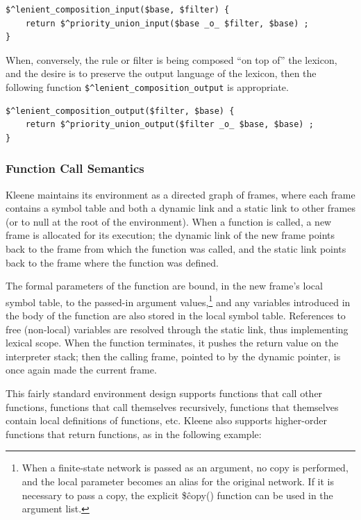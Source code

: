 \documentclass[letterpaper,12pt]{article}
\newcommand{\Kleene}{Kleene\xspace}
\begin{document}
\begin{Verbatim}[fontsize=\small]
$^lenient_composition_input($base, $filter) {
    return $^priority_union_input($base _o_ $filter, $base) ;
}
\end{Verbatim}

\noindent
When, conversely, the rule or filter is being
composed ``on top of'' the lexicon, and the desire is to
preserve the output language of the lexicon, then the following
function \verb!$^lenient_composition_output! is appropriate.

\begin{Verbatim}[fontsize=\small]
$^lenient_composition_output($filter, $base) {
    return $^priority_union_output($filter _o_ $base, $base) ;
}
\end{Verbatim}



\subsubsection{Function Call Semantics}

\Kleene{} maintains its environment as a directed graph of frames,
where each frame
contains a symbol table and both a dynamic link and a static link to other frames (or to null at the root of the environment).  When a function is called, a new
frame is allocated for its execution; the dynamic link of the
new frame points back to the frame
from which the function was called, and the static link points back to the
frame where the function was defined.  

The formal parameters of the function are bound, in the new frame's local
symbol table, to the passed-in argument values,\footnote{When a finite-state
network is passed as an argument, no copy is performed, and the local
parameter becomes an alias for the original network.  If it is
necessary to pass a copy, the explicit \$\^copy() function can be used
in the argument list.}  and any variables introduced in
the body of the function are also stored in the local symbol
table.  References to free (non-local) variables are resolved
through the static link, thus implementing lexical scope.  When the
function terminates, it pushes the return value on the interpreter stack; then
the calling frame, pointed to by the dynamic
pointer, is once again made the current frame.

This fairly standard environment design supports functions that call other
functions, functions that call themselves recursively, functions
that themselves contain local definitions of functions, etc.  \Kleene{}
also supports higher-order functions that return functions,
as in the following example:
\end{document}
